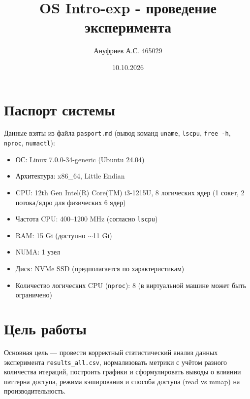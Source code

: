 \documentclass[12pt,a4paper]{article}
\title{OS Intro-exp - проведение эксперимента}
\author{Ануфриев А.С. 465029}
\date{10.10.2026}
\begin{document}
\maketitle

\section{Паспорт системы}
Данные взяты из файла \texttt{pasport.md} (вывод команд \texttt{uname}, \texttt{lscpu}, \texttt{free -h}, \texttt{nproc}, \texttt{numactl}):
\begin{itemize}
    \item ОС: Linux 7.0.0-34-generic (Ubuntu 24.04)
    \item Архитектура: x86\_64, Little Endian
    \item CPU: 12th Gen Intel(R) Core(TM) i3-1215U, 8 логических ядер (1 сокет, 2 потока/ядро для физических 6 ядер)
    \item Частота CPU: 400--1200 MHz (согласно \texttt{lscpu})
    \item RAM: 15 Gi (доступно $\sim$11 Gi)
    \item NUMA: 1 узел
    \item Диск: NVMe SSD (предполагается по характеристикам)
    \item Количество логических CPU (\texttt{nproc}): 8 (в виртуальной машине может быть ограничено)
\end{itemize}

\section{Цель работы}
Основная цель — провести корректный статистический анализ данных эксперимента \texttt{results\_all.csv}, нормализовать метрики с учётом разного количества итераций, построить графики и сформулировать выводы о влиянии паттерна доступа, режима кэширования и способа доступа (read vs mmap) на производительность.
\end{document}
